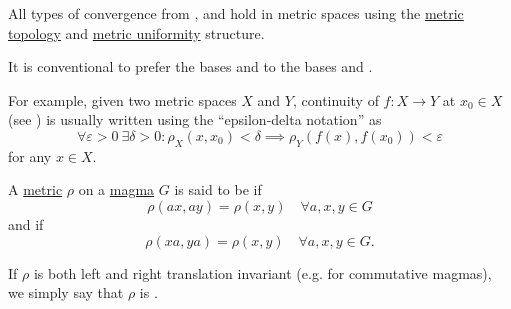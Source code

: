 \begin{remark}\label{rem:metric_space_convergence}
  All types of convergence from ,  and  hold in metric spaces using the \hyperref[def:metric_topology]{metric topology} and \hyperref[def:metric_uniformity]{metric uniformity} structure.

  It is conventional to prefer the bases  and  to the bases  and .

  For example, given two metric spaces \( X \) and \( Y \), continuity of \( f: X \to Y \) at \( x_0 \in X \) (see ) is usually written using the \enquote{epsilon-delta notation} as
  \begin{equation*}
    \forall \varepsilon > 0 \ \exists \delta > 0 : \rho_X(x, x_0) < \delta \implies \rho_Y(f(x), f(x_0)) < \varepsilon
  \end{equation*}
  for any \( x \in X \).
\end{remark}

\begin{definition}\label{def:translation_invariant_metric}
  A \hyperref[def:metric_space]{metric} \( \rho \) on a \hyperref[def:magma]{magma} \( G \) is said to be  if
  \begin{equation*}
    \rho(ax, ay) = \rho(x, y) \quad\forall a, x, y \in G
  \end{equation*}
  and  if
  \begin{equation*}
    \rho(xa, ya) = \rho(x, y) \quad\forall a, x, y \in G.
  \end{equation*}

  If \( \rho \) is both left and right translation invariant (e.g. for commutative magmas), we simply say that \( \rho \) is .
\end{definition}
